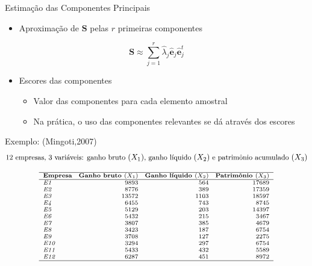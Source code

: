 \documentclass[
  ignorenonframetext,
  aspectratio=169,
]{beamer}
\providecommand{\tightlist}{%
  \setlength{\itemsep}{0pt}\setlength{\parskip}{0pt}}
\begin{document}
\begin{frame}{Estimação das Componentes Principais}
\label{estimauxe7uxe3o-das-componentes-principais-3}
\begin{itemize}
\tightlist
\item
  Aproximação de \(\boldsymbol{S}\) pelas \(r\) primeiras componentes
\end{itemize}

\[\boldsymbol{S} \approx \displaystyle \sum_{j=1}^r \hat{\lambda}_j \hat{\boldsymbol{e}}_j  \hat{\boldsymbol{e}}_j^t\]

\pause

\begin{itemize}
\tightlist
\item
  Escores das componentes

  \begin{itemize}
  \tightlist
  \item
    Valor das componentes para cada elemento amostral
  \item
    Na prática, o uso das componentes relevantes se dá através dos
    escores
  \end{itemize}
\end{itemize}
\end{frame}

\begin{frame}{Exemplo: (Mingoti,2007)}
\label{exemplo-mingoti2007}
\[\small
\text{12 empresas, 3 variáveis: ganho bruto }(X_1)\text{, ganho líquido }(X_2)\text{ e patrimônio acumulado }(X_3)
\]

\[\scriptsize
\begin{array}{l @{\quad} r @{\quad} r @{\quad} r}
\hline
\textbf{Empresa} &
\textbf{Ganho bruto }(X_1) &
\textbf{Ganho líquido }(X_2) &
\textbf{Patrimônio }(X_3) \\
\hline
\mathit{E1}  & 9893  & 564  & 17689 \\
\mathit{E2}  & 8776  & 389  & 17359 \\
\mathit{E3}  & 13572 & 1103 & 18597 \\
\mathit{E4}  & 6455  & 743  & 8745 \\
\mathit{E5}  & 5129  & 203  & 14397 \\
\mathit{E6}  & 5432  & 215  & 3467 \\
\mathit{E7}  & 3807  & 385  & 4679 \\
\mathit{E8}  & 3423  & 187  & 6754 \\
\mathit{E9}  & 3708  & 127  & 2275 \\
\mathit{E10} & 3294  & 297  & 6754 \\
\mathit{E11} & 5433  & 432  & 5589 \\
\mathit{E12} & 6287  & 451  & 8972 \\
\hline
\end{array}
\]
\end{frame}
\end{document}
